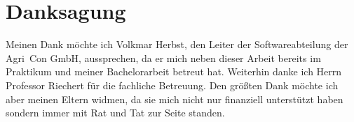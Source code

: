 
\chapter*{Danksagung}
\label{sec:Danksagung}

Meinen Dank möchte ich Volkmar Herbst, den Leiter der Softwareabteilung der Agri~Con GmbH, aussprechen, da er mich neben dieser Arbeit bereits im Praktikum und meiner Bachelorarbeit betreut hat.
Weiterhin danke ich Herrn Professor Riechert für die fachliche Betreuung.
Den größten Dank möchte ich aber meinen Eltern widmen, da sie mich nicht nur finanziell unterstützt haben sondern immer mit Rat und Tat zur Seite standen.